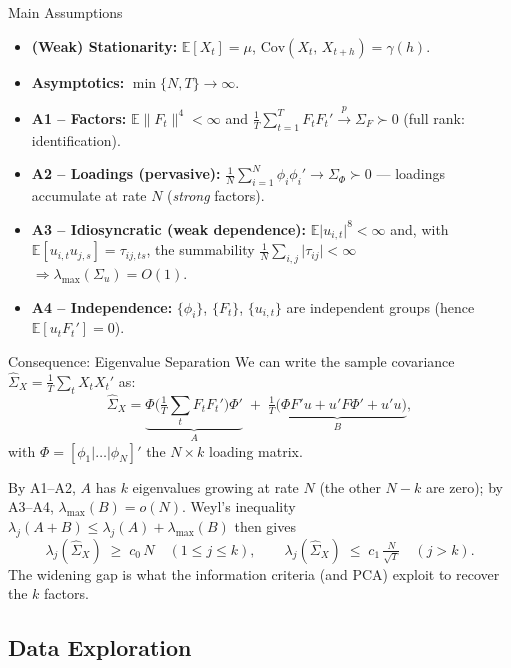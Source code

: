 \documentclass{beamer}
\begin{document}
\begin{frame}{Main Assumptions}
  \begin{itemize}
   \item \textbf{(Weak) Stationarity:} $\mathbb{E}[X_t] = \mu$, $\mathrm{Cov}(X_t,\,X_{t+h}) = \gamma(h)$.
    \item \textbf{Asymptotics:} $\min\{N,T\}\to\infty$.
    \item \textbf{A1 -- Factors:} $\mathbb{E}\lVert F_t\rVert^{4}<\infty$ and
          $\tfrac1T\sum_{t=1}^{T} F_tF_t' \xrightarrow{p} \Sigma_F \succ 0$
          (full rank: identification).
    \item \textbf{A2 -- Loadings (pervasive):}
          $\tfrac1N\sum_{i=1}^{N}\phi_i\phi_i' \to \Sigma_\Phi \succ 0$ ---
          loadings accumulate at rate $N$ (\emph{strong} factors).
    \item \textbf{A3 -- Idiosyncratic (weak dependence):}
          $\mathbb{E}\lvert u_{i,t}\rvert^{8}<\infty$ and, with
          $\mathbb{E}[u_{i,t}u_{j,s}]=\tau_{ij,ts}$, the summability
          $\tfrac1N\sum_{i,j}\lvert\tau_{ij}\rvert<\infty$
          $\Rightarrow \lambda_{\max}(\Sigma_u)=O(1)$.
    \item \textbf{A4 -- Independence:} $\{\phi_i\}$, $\{F_t\}$, $\{u_{i,t}\}$
          are independent groups (hence $\mathbb{E}[u_tF_t']=0$).
  \end{itemize}
\end{frame}

\begin{frame}{Consequence: Eigenvalue Separation}
  We can write the sample covariance $\hat\Sigma_X = \tfrac1T\sum_t X_tX_t'$ as:
  \[
    \hat\Sigma_X =
    \underbrace{\Phi\Big(\tfrac1T\textstyle\sum_t F_tF_t'\Big)\Phi'}_{A}
    \;+\;
    \underbrace{\tfrac1T\big(\Phi F'u + u'F\Phi' + u'u\big)}_{B},
  \]
  with $\Phi = [\phi_1|\dots|\phi_N]'$ the $N\times k$ loading matrix.
  
  By A1--A2, $A$ has $k$ eigenvalues growing at rate $N$ (the other $N{-}k$ are zero);
  by A3--A4, $\lambda_{\max}(B)=o(N)$. Weyl's inequality
  $\lambda_j(A+B)\le \lambda_j(A)+\lambda_{\max}(B)$ then gives
  \[
    \lambda_j(\hat\Sigma_X)\;\ge\; c_0\,N \quad (1\le j\le k),
    \qquad
   \lambda_j(\hat\Sigma_X)\;\le\; c_1\,\tfrac{N}{\sqrt{T}} \quad (j> k).
  \]
  The widening gap is what the information criteria (and PCA) exploit to recover
  the $k$ factors.
\end{frame}
\subsection{Data Exploration}
\end{document}
